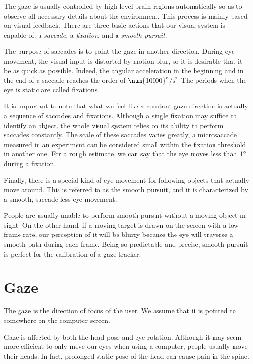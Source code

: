 The gaze is usually controlled by high-level brain regions automatically so as to observe all necessary details about the environment.
This process is mainly based on visual feedback.
There are three basic actions that our visual system is capable of: a \textit{saccade}, a \textit{fixation}, and a \textit{smooth pursuit}.

The purpose of saccades is to point the gaze in another direction.
During eye movement, the visual input is distorted by motion blur, so it is desirable that it be as quick as possible.
Indeed, the angular acceleration in the beginning and in the end of a saccade reaches the order of $\num{10000}\degree/\mathrm{s}^2$
The periods when the eye is static are called fixations.

It is important to note that what we feel like a constant gaze direction is actually a sequence of saccades and fixations.
Although a single fixation may suffice to identify an object, the whole visual system relies on its ability to perform saccades constantly.
The scale of these saccades varies greatly, a microsaccade measured in an experiment can be considered small within the fixation threshold in another one.
For a rough estimate, we can say that the eye moves less than $1\degree$ during a fixation.

Finally, there is a special kind of eye movement for following objects that actually move around.
This is referred to as the smooth pursuit, and it is characterized by a smooth, saccade-less eye movement.

People are usually unable to perform smooth pursuit without a moving object in sight.
On the other hand, if a moving target is drawn on the screen with a low frame rate, our perception of it will be blurry because the eye will traverse a smooth path during each frame.
Being so predictable and precise, smooth pursuit is perfect for the calibration of a gaze tracker.

\section{Gaze}
\label{s:gaze-model}

The gaze is the direction of focus of the user.
We assume that it is pointed to somewhere on the computer screen.

Gaze is affected by both the head pose and eye rotation.
Although it may seem more efficient to only move our eyes when using a computer, people usually move their heads.
In fact, prolonged static pose of the head can cause pain in the spine.

